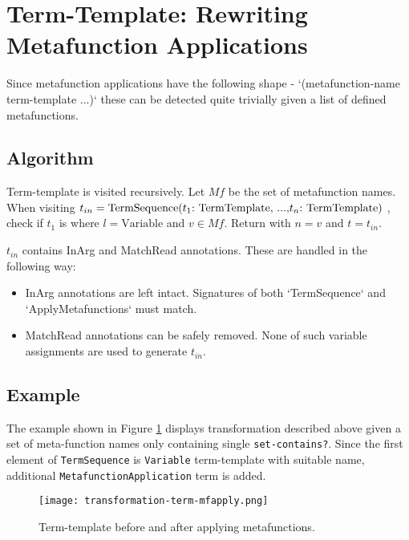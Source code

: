 \section{Term-Template: Rewriting Metafunction Applications}

Since metafunction applications have the following shape - `(metafunction-name term-template ...)` these can be detected quite trivially given a list of defined metafunctions. 

\subsection{Algorithm}
Term-template is visited recursively. Let $Mf$ be the set of metafunction names. When visiting $t_{in}=\text{\TermSequence}$, check if $t_1$ is \TermLiteral where $l=\text{Variable}$ and $v \in Mf$. Return \ApplyMetafunction with $n=v$ and $t=t_{in}$.

$t_{in}$ contains InArg and MatchRead annotations. These are handled in the following way:

\begin{itemize}
\item
InArg annotations are left intact. Signatures of both `TermSequence` and `ApplyMetafunctions` must match.
\item
MatchRead annotations can be safely removed. None of such variable assignments are used to generate $t_{in}$.
\end{itemize}

\subsection{Example}

The example shown in Figure \ref{transformation-term-mfapply} displays transformation described above given a set of meta-function names only containing single \texttt{set-contains?}. Since the first element of \texttt{TermSequence} is \texttt{Variable} term-template with suitable name, additional \texttt{MetafunctionApplication} term is added.

\begin{figure}[H]
\texttt{[image: transformation-term-mfapply.png]}
\caption{Term-template before and after applying metafunctions.}
\label{transformation-term-mfapply}
\end{figure}
